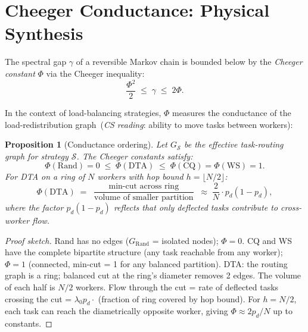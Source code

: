 \documentclass[11pt,a4paper]{report}
\newtheorem{proposition}[theorem]{Proposition}
\newcommand{\physics}[2]{#1\ \textnormal{(\emph{CS reading}: #2)}}
\begin{document}
\section{Cheeger Conductance: Physical Synthesis}
\label{sec:cheeger}

The spectral gap $\gamma$ of a reversible Markov chain is bounded below by
the \emph{Cheeger constant} $\Phi$ via the Cheeger inequality:
\begin{equation}\label{eq:cheeger}
  \frac{\Phi^2}{2} \;\le\; \gamma \;\le\; 2\Phi.
\end{equation}

In the context of load-balancing strategies, $\Phi$ measures the
\physics{conductance of the load-redistribution graph}{ability to move tasks between workers}:

\begin{proposition}[Conductance ordering]\label{prop:conductance}
Let $G_{\mathcal{S}}$ be the effective task-routing graph for strategy $\mathcal{S}$.
The Cheeger constants satisfy:
\[
  \Phi(\mathrm{Rand}) = 0 \;\le\; \Phi(\mathrm{DTA}) \;\le\; \Phi(\mathrm{CQ}) = \Phi(\mathrm{WS}) = 1.
\]
For DTA on a ring of $N$ workers with hop bound $h = \lfloor N/2 \rfloor$:
\begin{equation}\label{eq:cheeger_dta}
  \Phi(\mathrm{DTA}) \;=\; \frac{\min\text{-cut across ring}}{\text{volume of smaller partition}}
  \;\approx\; \frac{2}{N} \cdot p_d(1-p_d),
\end{equation}
where the factor $p_d(1-p_d)$ reflects that only deflected tasks contribute
to cross-worker flow.
\end{proposition}

\begin{proof}[Proof sketch]
Rand has no edges ($G_{\mathrm{Rand}}$ = isolated nodes); $\Phi = 0$.
CQ and WS have the complete bipartite structure (any task reachable from any worker);
$\Phi = 1$ (connected, min-cut = 1 for any balanced partition).
DTA: the routing graph is a ring; balanced cut at the ring's diameter removes
2 edges.  The volume of each half is $N/2$ workers.  Flow through the cut
= rate of deflected tasks crossing the cut = $\lambda_0 p_d \cdot$ (fraction of ring
covered by hop bound).  For $h = N/2$, each task can reach the diametrically
opposite worker, giving $\Phi \approx 2p_d/N$ up to constants.
\end{proof}
\end{document}
